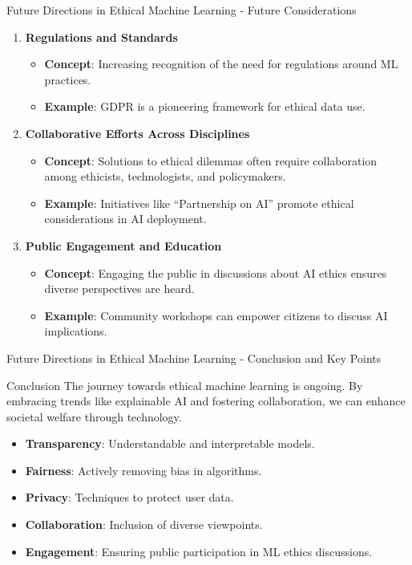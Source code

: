 \documentclass[aspectratio=169]{beamer}
\begin{document}
\begin{frame}[fragile]{Future Directions in Ethical Machine Learning - Future Considerations}
    \begin{enumerate}
        \item \textbf{Regulations and Standards}
            \begin{itemize}
                \item \textbf{Concept}: Increasing recognition of the need for regulations around ML practices.
                \item \textbf{Example}: GDPR is a pioneering framework for ethical data use.
            \end{itemize}
        
        \item \textbf{Collaborative Efforts Across Disciplines}
            \begin{itemize}
                \item \textbf{Concept}: Solutions to ethical dilemmas often require collaboration among ethicists, technologists, and policymakers.
                \item \textbf{Example}: Initiatives like “Partnership on AI” promote ethical considerations in AI deployment.
            \end{itemize}
            
        \item \textbf{Public Engagement and Education}
            \begin{itemize}
                \item \textbf{Concept}: Engaging the public in discussions about AI ethics ensures diverse perspectives are heard.
                \item \textbf{Example}: Community workshops can empower citizens to discuss AI implications.
            \end{itemize}
    \end{enumerate}
\end{frame}

\begin{frame}[fragile]{Future Directions in Ethical Machine Learning - Conclusion and Key Points}
    \begin{block}{Conclusion}
        The journey towards ethical machine learning is ongoing. 
        By embracing trends like explainable AI and fostering collaboration, we can enhance societal welfare through technology.
    \end{block}
    
    \begin{itemize}
        \item \textbf{Transparency}: Understandable and interpretable models.
        \item \textbf{Fairness}: Actively removing bias in algorithms.
        \item \textbf{Privacy}: Techniques to protect user data.
        \item \textbf{Collaboration}: Inclusion of diverse viewpoints.
        \item \textbf{Engagement}: Ensuring public participation in ML ethics discussions.
    \end{itemize}
\end{frame}
\end{document}
